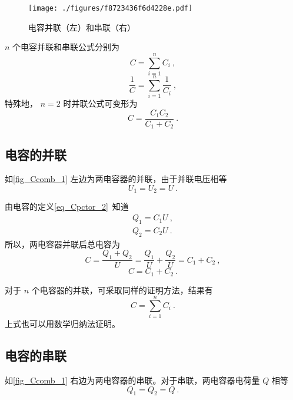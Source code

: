 

\begin{figure}[ht]
\centering
\texttt{[image: ./figures/f8723436f6d4228e.pdf]}
\caption{电容并联（左）和串联（右）} \label{fig_Ccomb_1}
\end{figure}

$n$ 个电容并联和串联公式分别为
\begin{equation}
C=\sum_{i=1}^{n}C_i~,
\end{equation}
\begin{equation}
\frac{1}{C}=\sum_{i=1}^{n}\frac{1}{C_i}~,
\end{equation}
特殊地， $n = 2$ 时并联公式可变形为
\begin{equation}
C = \frac{C_1 C_2}{C_1 + C_2}~.
\end{equation}


\subsection{电容的并联}
如\autoref{fig_Ccomb_1} 左边为两电容器的并联，由于并联电压相等
\begin{equation}
U_1=U_2=U~.
\end{equation}

由电容的定义\autoref{eq_Cpctor_2}~知道
\begin{equation}
\begin{aligned}
Q_1=C_1U~,\\
Q_2=C_2U~.
\end{aligned}
\end{equation}
所以，两电容器并联后总电容为
\begin{equation}
C=\frac{Q_1+Q_2}{U}=\frac{Q_1}{U}+\frac{Q_2}{U}=C_1+C_2~,
\end{equation}
\begin{equation}
C = C_1 + C_2~.
\end{equation}

对于 $n$ 个电容器的并联，可采取同样的证明方法，结果有
\begin{equation}
C=\sum_{i=1}^{n}C_i~.
\end{equation}
上式也可以用数学归纳法证明。

\subsection{电容的串联}
如\autoref{fig_Ccomb_1} 右边为两电容器的串联。对于串联，两电容器电荷量 $Q$ 相等
\begin{equation}
Q_1=Q_2=Q~.
\end{equation}

